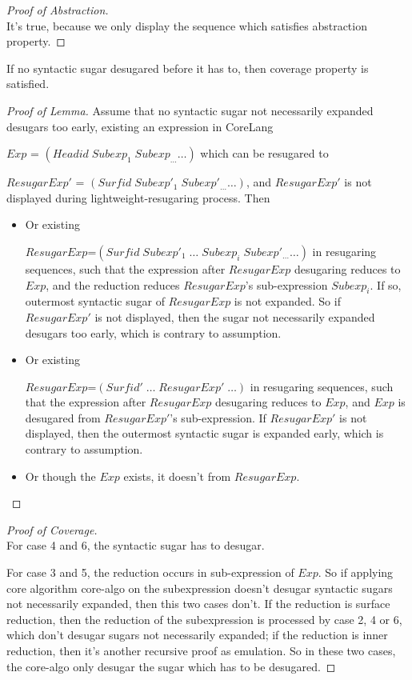 \begin{proof}[Proof of Abstraction]
\hfill\\
It's true, because we only display the sequence which satisfies abstraction property.
\end{proof}

\begin{lemma}
If no syntactic sugar desugared before it has to, then coverage property is satisfied.
\end{lemma}

\begin{proof}[Proof of Lemma]
Assume that no syntactic sugar not necessarily expanded desugars too early, existing an expression in CoreLang

$Exp$ = $(Headid\;Subexp_{1}\;Subexp_{\ldots} \ldots)$ which can be resugared to

$ResugarExp'$ = $(Surfid\;Subexp'_{1}\;Subexp'_{\ldots}\ldots)$, and $ResugarExp'$ is not displayed during lightweight-resugaring process. Then

\begin{itemize}
	\item Or existing

	$ResugarExp$=$(Surfid\;Subexp'_{1}\;\ldots\;Subexp_{i}\;Subexp'_{\ldots}\ldots)$ in resugaring sequences, such that the expression after $ResugarExp$ desugaring reduces to $Exp$, and the reduction reduces $ResugarExp$'s sub-expression $Subexp_{i}$. If so, outermost syntactic sugar of $ResugarExp$ is not expanded. So if $ResugarExp'$ is not displayed, then the sugar not necessarily expanded desugars too early, which is contrary to assumption.


	\item Or existing

	$ResugarExp$=$(Surfid'\;\ldots\;ResugarExp'\;\ldots)$ in resugaring sequences, such that the expression after $ResugarExp$ desugaring reduces to $Exp$, and $Exp$ is desugared from $ResugarExp'$'s sub-expression. If $ResugarExp'$ is not displayed, then the outermost syntactic sugar is expanded early, which is contrary to assumption.
	\item Or though the $Exp$ exists, it doesn't from $ResugarExp$.

\end{itemize}
\end{proof}

\begin{proof}[Proof of Coverage]
\hfill\\
For case 4 and 6, the syntactic sugar has to desugar.

For case 3 and 5, the reduction occurs in sub-expression of $Exp$. So if applying core algorithm core-algo on the subexpression doesn't desugar syntactic sugars not necessarily expanded, then this two cases don't. If the reduction is surface reduction, then the reduction of the subexpression is processed by case 2, 4 or 6, which don't desugar sugars not necessarily expanded; if the reduction is inner reduction, then it's another recursive proof as emulation. So in these two cases, the core-algo only desugar the sugar which has to be desugared.
\end{proof}

